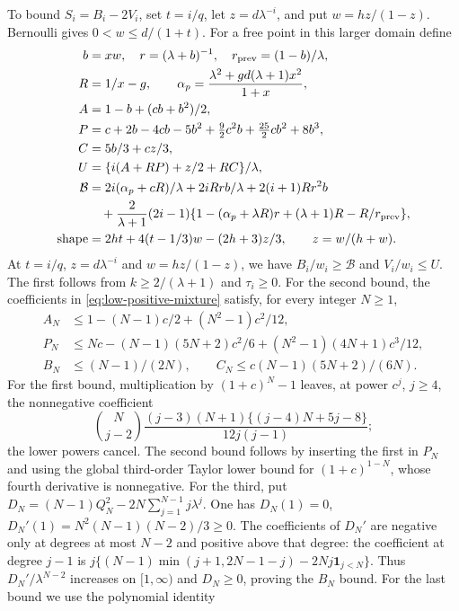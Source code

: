 To bound $S_i=B_i-2V_i$, set $t=i/q$, let
$z=d\lambda^{-i}$, and put $w=hz/(1-z)$.  Bernoulli gives
$0<w\le d/(1+t)$.  For a free point in this larger domain define
\begin{align}
 b&=xw,\quad r=(\lambda+b)^{-1},\quad r_{\rm prev}=(1-b)/\lambda,
 \nonumber\\
 R&=1/x-g,\qquad
 \alpha_p=\frac{\lambda^2+gd(\lambda+1)x^2}{1+x},
 \nonumber\\
 A&=1-b+(cb+b^2)/2,\nonumber\\
 P&=c+2b-4cb-5b^2+\tfrac92c^2b+\tfrac{25}2cb^2+8b^3,\nonumber\\
 C&=5b/3+cz/3,\nonumber\\
 U&=\{i(A+RP)+z/2+RC\}/\lambda,\nonumber\\
 \mathcal B&=2i(\alpha_p+cR)/\lambda+2iRrb/\lambda
             +2(i+1)Rr^2b\nonumber\\
 &\quad+\frac2{\lambda+1}(2i-1)
                \{1-(\alpha_p+\lambda R)r+(\lambda+1)R-R/r_{\rm prev}\},
 \nonumber\\
 \operatorname{shape}&=2ht+4(t-1/3)w-(2h+3)z/3,
 \qquad z=w/(h+w).\label{eq:low-large-price-rationals}
\end{align}
At $t=i/q$, $z=d\lambda^{-i}$ and $w=hz/(1-z)$, we have
$B_i/w_i\ge\mathcal B$ and $V_i/w_i\le U$.
The first follows from $k\ge2/(\lambda+1)$ and $\tau_i\ge0$.
For the second bound, the coefficients in
\eqref{eq:low-positive-mixture} satisfy, for every integer $N\ge1$,
\begin{align*}
 A_N&\le1-(N-1)c/2+(N^2-1)c^2/12,\\
 P_N&\le Nc-(N-1)(5N+2)c^2/6+(N^2-1)(4N+1)c^3/12,\\
 B_N&\le(N-1)/(2N),\qquad
 C_N\le c(N-1)(5N+2)/(6N).
\end{align*}
For the first bound, multiplication by $(1+c)^N-1$ leaves, at
power $c^j$, $j\ge4$, the nonnegative coefficient
\[
 \binom{N}{j-2}
 \frac{(j-3)(N+1)\{(j-4)N+5j-8\}}{12j(j-1)};
\]
the lower powers cancel.  The second bound follows by inserting the
first in $P_N$ and using the global third-order Taylor lower bound
for $(1+c)^{1-N}$, whose fourth derivative is nonnegative.
For the third, put
$D_N=(N-1)Q_N^2-2N\sum_{j=1}^{N-1}j\lambda^j$.
One has $D_N(1)=0$,
$D_N'(1)=N^2(N-1)(N-2)/3\ge0$.
The coefficients of $D_N'$ are negative only at degrees at most
$N-2$ and positive above that degree: the coefficient at degree
$j-1$ is
$j\{(N-1)\min(j+1,2N-1-j)-2Nj\mathbf1_{j<N}\}$.
Thus $D_N'/\lambda^{N-2}$ increases on $[1,\infty)$ and
$D_N\ge0$, proving the $B_N$ bound.
For the last bound we use the polynomial identity
